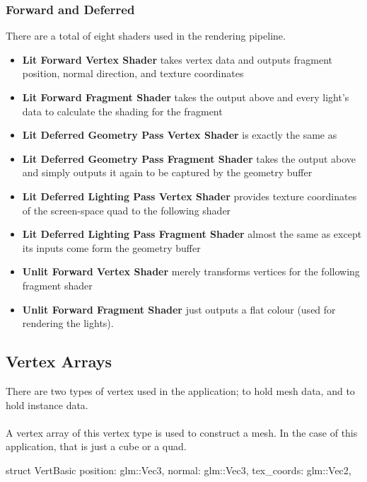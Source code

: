 \subsubsection{Forward and Deferred}
There are a total of eight shaders used in the rendering pipeline.
\begin{itemize}
  \item {} \textbf{Lit Forward Vertex Shader} takes vertex data and outputs fragment position, normal direction, and texture coordinates
  \item {} \textbf{Lit Forward Fragment Shader} takes the output above and every light's data to calculate the shading for the fragment
  \item {} \textbf{Lit Deferred Geometry Pass Vertex Shader} is exactly the same as 
  \item {} \textbf{Lit Deferred Geometry Pass Fragment Shader} takes the output above and simply outputs it again to be captured by the geometry buffer
  \item {} \textbf{Lit Deferred Lighting Pass Vertex Shader} provides texture coordinates of the screen-space quad to the following shader
  \item {} \textbf{Lit Deferred Lighting Pass Fragment Shader} almost the same as  except its inputs come form the geometry buffer
  \item {} \textbf{Unlit Forward Vertex Shader} merely transforms vertices for the following fragment shader
  \item {} \textbf{Unlit Forward Fragment Shader} just outputs a flat colour (used for rendering the lights).
\end{itemize}

\subsection{Vertex Arrays}
There are two types of vertex used in the application;  to hold mesh data, and  to hold instance data.

\paragraph{}
A vertex array of this vertex type is used to construct a mesh.
In the case of this application, that is just a cube or a quad.
  \begin{rustcode}
struct VertBasic {
    position: glm::Vec3,
    normal: glm::Vec3,
    tex_coords: glm::Vec2,
}
  \end{rustcode}

